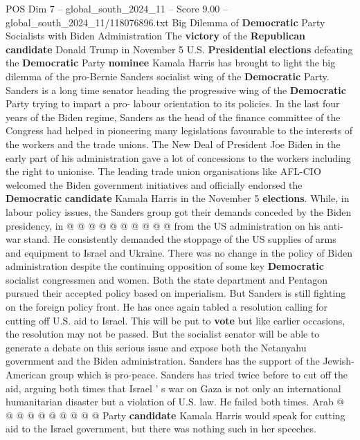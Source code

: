 \begin{textsample}{POS Dim 7 – global\_south\_2024\_11 – Score 9.00 – global\_south\_2024\_11/118076896.txt}  \label{ex:f7_pos_144}
Big Dilemma of \textbf{Democratic} Party Socialists with Biden Administration The \textbf{victory} of the \textbf{Republican} \textbf{candidate} Donald Trump in November 5 U.S. \textbf{Presidential} \textbf{elections} defeating the \textbf{Democratic} Party \textbf{nominee} Kamala Harris has brought to light the big dilemma of the pro-Bernie Sanders socialist wing of the \textbf{Democratic} Party.
Sanders is a long time senator heading the progressive wing of the \textbf{Democratic} Party trying to impart a pro- labour orientation to its policies.
In the last four years of the Biden regime, Sanders as the head of the finance committee of the Congress had helped in pioneering many legislations favourable to the interests of the workers and the trade unions.
The New Deal of President Joe Biden in the early part of his administration gave a lot of concessions to the workers including the right to unionise.
The leading trade union organisations like AFL-CIO welcomed the Biden government initiatives and officially endorsed the \textbf{Democratic} \textbf{candidate} Kamala Harris in the November 5 \textbf{elections}.
While, in labour policy issues, the Sanders group got their demands conceded by the Biden presidency, in @ @ @ @ @ @ @ @ @ @ from the US administration on his anti-war stand.
He consistently demanded the stoppage of the US supplies of arms and equipment to Israel and Ukraine.
There was no change in the policy of Biden administration despite the continuing opposition of some key \textbf{Democratic} socialist congressmen and women.
Both the state department and Pentagon pursued their accepted policy based on imperialism.
But Sanders is still fighting on the foreign policy front.
He has once again tabled a resolution calling for cutting off U.S. aid to Israel.
This will be put to \textbf{vote} but like earlier occasions, the resolution may not be passed.
But the socialist senator will be able to generate a debate on this serious issue and expose both the Netanyahu government and the Biden administration.
Sanders has the support of the Jewish- American group which is pro-peace.
Sanders has tried twice before to cut off the aid, arguing both times that Israel ' s war on Gaza is not only an international humanitarian disaster but a violation of U.S. law.
He failed both times.
Arab @ @ @ @ @ @ @ @ @ @ Party \textbf{candidate} Kamala Harris would speak for cutting aid to the Israel government, but there was nothing such in her speeches.

\end{textsample}

